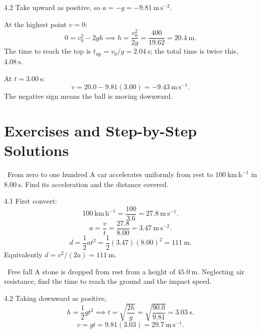 \begin{solution}{4.2}
Take upward as positive, so $a=-g=-9.81\ \mathrm{m\,s^{-2}}$.

At the highest point $v=0$:
\[
0=v_0^2-2gh
\implies
h=\frac{v_0^2}{2g}=\frac{400}{19.62}=20.4\ \mathrm{m}.
\]
The time to reach the top is $t_{\mathrm{up}}=v_0/g=2.04\ \mathrm{s}$; the total
time is twice this, $4.08\ \mathrm{s}$.

At $t=3.00\ \mathrm{s}$:
\[
v=20.0-9.81(3.00)=-9.43\ \mathrm{m\,s^{-1}}.
\]
The negative sign means the ball is moving downward.
\end{solution}

\section{Exercises and Step-by-Step Solutions}

\begin{exercise}{\warm\ From zero to one hundred}
A car accelerates uniformly from rest to $100\ \mathrm{km\,h^{-1}}$ in
$8.00\ \mathrm{s}$. Find its acceleration and the distance covered.
\end{exercise}

\begin{tabletworkspace}[6.5cm]
\end{tabletworkspace}

\begin{solution}{4.1}
First convert:
\[
100\ \mathrm{km\,h^{-1}}=\frac{100}{3.6}=27.8\ \mathrm{m\,s^{-1}}.
\]
\[
a=\frac{v}{t}=\frac{27.8}{8.00}=3.47\ \mathrm{m\,s^{-2}}.
\]
\[
d=\frac12at^2=\frac12(3.47)(8.00)^2=111\ \mathrm{m}.
\]
Equivalently $d=v^2/(2a)=111\ \mathrm{m}$.
\end{solution}

\begin{exercise}{\warm\ Free fall}
A stone is dropped from rest from a height of $45.0\ \mathrm{m}$. Neglecting air
resistance, find the time to reach the ground and the impact speed.
\end{exercise}

\begin{tabletworkspace}[6.5cm]
\end{tabletworkspace}

\begin{solution}{4.2}
Taking downward as positive,
\[
h=\frac12gt^2
\implies
t=\sqrt{\frac{2h}{g}}=\sqrt{\frac{90.0}{9.81}}=3.03\ \mathrm{s}.
\]
\[
v=gt=9.81(3.03)=29.7\ \mathrm{m\,s^{-1}}.
\]
\end{solution}

